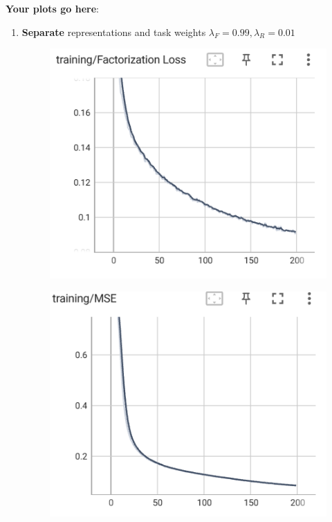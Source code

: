 \documentclass[12pt]{article}
\begin{document}
\newpage
\noindent\textbf{Your plots go here}:

\begin{enumerate}
    
    \item \textbf{Separate} representations and task weights  $\lambda_F=0.99, \lambda_R=0.01$
    
    \begin{figure}[htbp]
	\centering
	\begin{minipage}{0.4\linewidth}
		\centering
		\includegraphics[width=0.9\linewidth]{./figs/factorization_loss_99_1.png}
		\label{pic one}%
	\end{minipage}
	\begin{minipage}{0.4\linewidth}
		\centering
		\includegraphics[width=0.9\linewidth]{./figs/mse_99_1.png}

\end{minipage}
\end{figure}
\end{enumerate}
\end{document}
